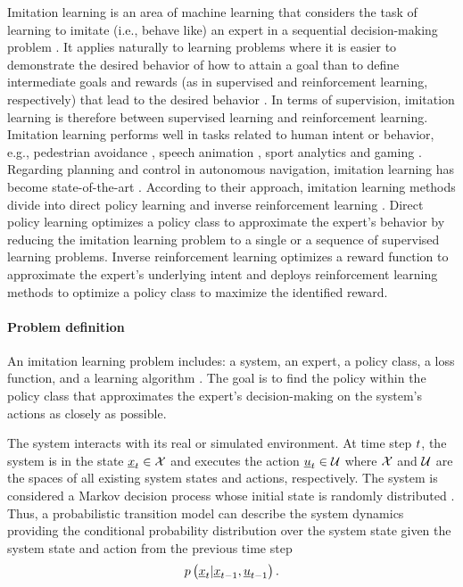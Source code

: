 Imitation learning is an area of machine learning 
that considers the task of learning to
imitate (i.e., behave like) an expert 
in a sequential decision-making problem \cite{yue2018imitation}.
It applies naturally to learning problems where it is easier 
to demonstrate the desired behavior of how to attain a goal
than to define intermediate goals and rewards 
(as in supervised and reinforcement learning, respectively)
that lead to the desired behavior \cite{Nikolov2018}.
In terms of supervision,
imitation learning is therefore
between supervised learning
and reinforcement learning.
Imitation learning performs well in tasks
related to human intent or behavior, e.g.,
pedestrian avoidance \cite{Ziebart2009},
speech animation \cite{Taylor2017},
sport analytics \cite{le2017data}
and gaming \cite{thurau2004imitation}.
Regarding
planning and control
in autonomous navigation,
imitation learning has become 
state-of-the-art \cite{Mero2022}.
According to their approach, 
imitation learning methods 
divide into direct policy learning and 
inverse reinforcement learning \cite{RobotAutonomy2}.
Direct policy learning 
optimizes a policy class 
to approximate the expert's behavior
by reducing the imitation learning problem
to a single or a sequence of supervised learning problems.
Inverse reinforcement learning
optimizes a reward function 
to approximate the expert's underlying intent
and deploys reinforcement learning methods
to optimize a policy class to maximize the identified reward. 







\paragraph*{Problem definition}$\ $\\
An imitation learning problem includes: 
a system, 
an expert, 
a policy class, 
a loss function, 
and a learning algorithm \cite{yue2018imitation}.
The goal is to find the policy 
within the policy class 
that approximates the expert's decision-making 
on the system's actions
as closely as possible. 

The system interacts with its real or simulated environment.
At time step $t$,
the system is in the state $\underline{x}_t \in \mathcal{X}$
and executes the action $\underline{u}_t \in \mathcal{U}$
where $\mathcal{X}$ and $\mathcal{U}$ are the 
spaces of all existing system states and actions, respectively.
The system is considered a Markov decision process
whose initial state is randomly distributed 
\cite{RobotAutonomy2}.
Thus, a probabilistic transition model can 
describe the system dynamics 
providing the conditional probability distribution 
over the system state 
given the system state and action from the previous time step
\begin{align}
    p \left({
        \underline{x}_t | \underline{x}_{t -1}, \underline{u}_{t -1}
    }\right).
\end{align}

